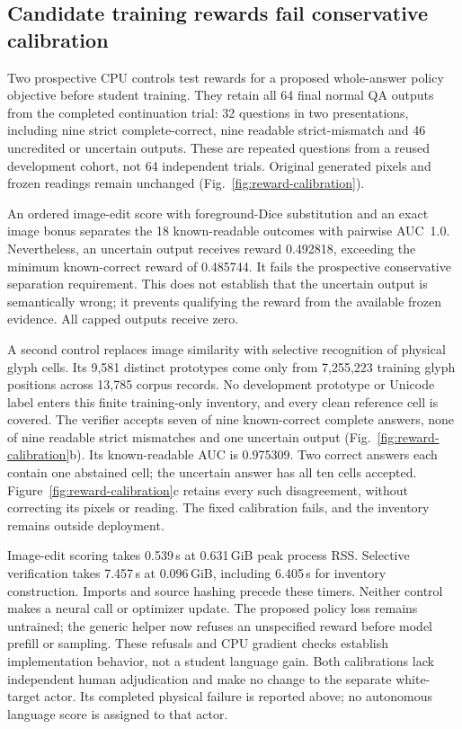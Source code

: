 \subsection*{Candidate training rewards fail conservative calibration}

Two prospective CPU controls test rewards for a proposed whole-answer policy
objective before student training. They retain all 64 final normal QA outputs
from the completed continuation trial: 32 questions in two presentations,
including nine strict complete-correct, nine readable strict-mismatch and
46 uncredited or uncertain outputs. These are repeated questions from a reused
development cohort, not 64 independent trials. Original generated pixels and
frozen readings remain unchanged (Fig.~\ref{fig:reward-calibration}).

An ordered image-edit score with foreground-Dice substitution and an exact
image bonus separates the 18 known-readable outcomes with pairwise AUC~1.0.
Nevertheless, an uncertain output receives reward 0.492818, exceeding the
minimum known-correct reward of 0.485744. It fails the prospective conservative
separation requirement. This does not establish that the uncertain output is
semantically wrong; it prevents qualifying the reward from the available
frozen evidence. All capped outputs receive zero.

A second control replaces image similarity with selective recognition of
physical glyph cells. Its 9,581 distinct prototypes come only from 7,255,223
training glyph positions across 13,785 corpus records. No development prototype
or Unicode label enters this finite training-only inventory, and every clean
reference cell is covered. The verifier accepts seven of nine known-correct
complete answers, none of nine readable strict mismatches and one uncertain
output (Fig.~\ref{fig:reward-calibration}b). Its known-readable AUC is 0.975309.
Two correct answers each contain one abstained cell; the uncertain answer has
all ten cells accepted. Figure~\ref{fig:reward-calibration}c retains every such
disagreement, without correcting its pixels or reading. The fixed calibration
fails, and the inventory remains outside deployment.

Image-edit scoring takes 0.539\,s at 0.631\,GiB peak process RSS. Selective
verification takes 7.457\,s at 0.096\,GiB, including 6.405\,s for inventory
construction. Imports and source hashing precede these timers. Neither control
makes a neural call or optimizer update. The proposed policy loss remains
untrained; the generic helper now refuses an unspecified reward before model
prefill or sampling. These refusals and CPU gradient checks establish
implementation behavior, not a student language gain. Both calibrations lack
independent human adjudication and make no change to the separate white-target
actor. Its completed physical failure is reported above; no autonomous language
score is assigned to that actor.
